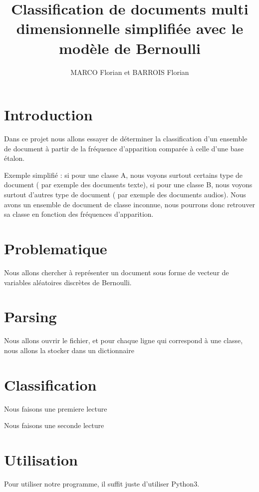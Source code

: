 \documentclass[a4paper,11pt]{article}
\title{Classification de documents multi dimensionnelle simplifiée avec le modèle de Bernoulli}
\author{MARCO Florian et BARROIS Florian}
\date{}
\begin{document}
\maketitle

\section{Introduction}

Dans ce projet nous allons essayer de déterminer la classification d'un ensemble de document à partir de la fréquence d'apparition comparée à celle d'une base étalon.

Exemple simplifié : si pour une classe A, nous voyons surtout certains type de document ( par exemple des documents texte), si pour une classe B, nous voyons surtout d'autres type de document ( par exemple des documents audios). 
Nous avons un ensemble de document de classe inconnue, nous pourrons donc retrouver sa classe en fonction des fréquences d'apparition.

\section{Problematique}

Nous allons chercher à représenter un document sous forme de vecteur de variables aléatoires discrètes de Bernoulli. 

\section{Parsing}

Nous allons ouvrir le fichier, et pour chaque ligne qui correspond à une classe, nous allons la stocker dans un dictionnaire

\section{Classification}

Nous faisons une premiere lecture

Nous faisons une seconde lecture

\section{Utilisation}

Pour utiliser notre programme, il suffit juste d'utiliser Python3.
\end{document}
